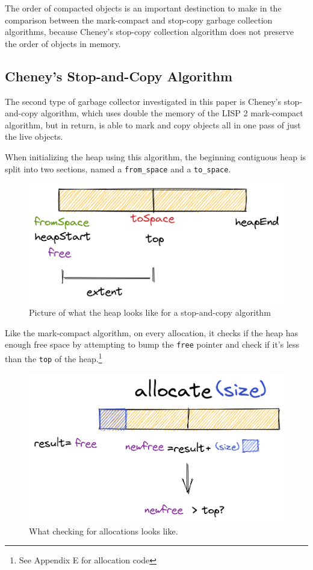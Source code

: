 \documentclass[index]{subfiles}
\begin{document}
The order of compacted objects is an important destinction to make in the comparison between the mark-compact and stop-copy garbage collection algorithms, because Cheney's stop-copy collection algorithm does not preserve the order of objects in memory.

\subsection{Cheney's Stop-and-Copy Algorithm}

The second type of garbage collector investigated in this paper is Cheney's stop-and-copy algorithm, which uses double the memory of the LISP 2 mark-compact algorithm, but in return, is able to mark and copy objects all in one pass of just the live objects.

When initializing the heap using this algorithm, the beginning contiguous heap is split into two sections, named a \verb+from_space+ and a \verb+to_space+\cite[Chapter~2]{gc_handbook}.

\begin{figure}[H]
    \centering
    \includegraphics[scale=0.3]{pics/split-heap-diagram.png}
    \caption{Picture of what the heap looks like for a stop-and-copy algorithm}
\end{figure}

Like the mark-compact algorithm, on every allocation, it checks if the heap has enough free space by attempting to bump the \verb+free+ pointer and check if it's less than the \verb+top+ of the heap.\footnote{See Appendix E for allocation code}

\begin{figure}[H]
    \centering
    \includegraphics[scale=0.3]{pics/allocation.png}
    \caption{What checking for allocations looks like.}
\end{figure}
\end{document}

